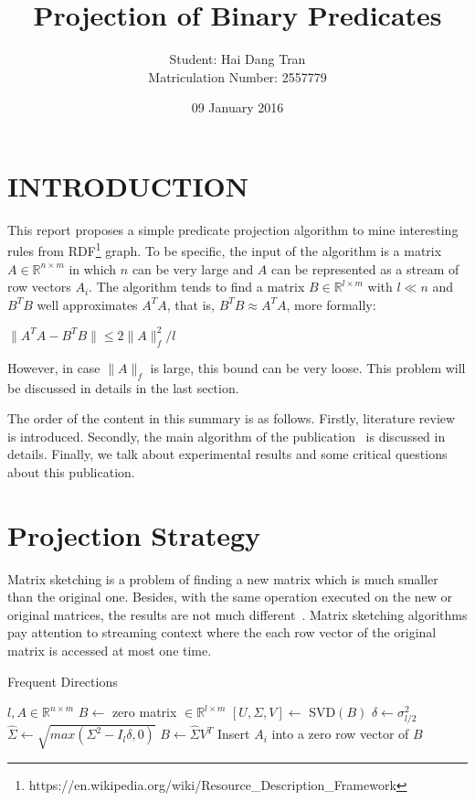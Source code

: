 \documentclass{acm_proc_article-sp}
\begin{document}
\title{Projection of Binary Predicates}
\author{
\alignauthor
Student: Hai Dang Tran\\Matriculation Number: 2557779
}
\date{09 January 2016}

\maketitle

\section{INTRODUCTION}
This report proposes a simple predicate projection algorithm to mine interesting rules from RDF\footnote{https://en.wikipedia.org/wiki/Resource_Description_Framework} graph. To be specific, the input of the algorithm is a matrix $A \in \mathbb{R}^{n \times m}$ in which $n$ can be very large and $A$ can be represented as a stream of row vectors $A_{i}$. The algorithm tends to find a matrix $B \in \mathbb{R}^{l \times m}$ with $l \ll n$ and $B^TB$ well approximates $A^TA$, that is, $B^TB \approx A^TA$, more formally:

$\|A^TA - B^TB\| \leq 2\|A\|^2_{f} / l$

However, in case $\|A\|_{f}$ is large, this bound can be very loose. This problem will be discussed in details in the last section.

The order of the content in this summary is as follows. Firstly, literature review is introduced. Secondly, the main algorithm of the publication~\cite{ref1} is discussed in details. Finally, we talk about experimental results and some critical questions about this publication.\\

\section{Projection Strategy}

Matrix sketching is a problem of finding a new matrix which is much smaller than the original one. Besides, with the same operation executed on the new or original matrices, the results are not much different~\cite{ref1}. Matrix sketching algorithms pay attention to streaming context where the each row vector of the original matrix is accessed at most one time.

\begin{algorithm}
\caption{Frequent Directions~\cite{ref1}}
\label{algo1}
\begin{algorithmic}
\REQUIRE $l, A \in \mathbb{R}^{n \times m}$
\STATE $B \leftarrow$ zero matrix $\in \mathbb{R}^{l \times m}$
\STATE $[U, \Sigma, V] \leftarrow$ SVD$(B)$
\STATE $\delta \leftarrow \sigma^2_{l/2}$
\STATE $\hat{\Sigma} \leftarrow \sqrt{max(\Sigma^2 - I_{l} \delta, 0)}$
\STATE $B \leftarrow \hat{\Sigma} V^T$
\ENDIF
\STATE Insert $A_{i}$ into a zero row vector of $B$
\ENDFOR
\end{algorithmic}
\end{algorithm}
\end{document}
